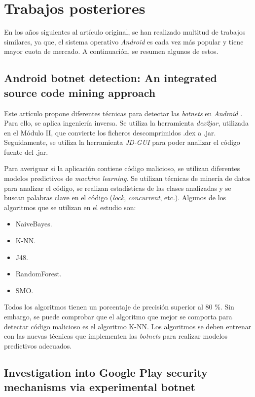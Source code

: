 \documentclass[a4paper,11pt]{report}
\begin{document}
\chapter{Trabajos posteriores} \label{tPosteriores}

En los años siguientes al artículo original, se han realizado multitud de trabajos similares, ya que, el sistema operativo \emph{Android} es cada vez más popular y tiene mayor cuota de mercado. A continuación, se resumen algunos de estos.

\section{Android botnet detection: An integrated source code mining approach}

Este artículo propone diferentes técnicas para detectar las \emph{botnets} en \emph{Android} \cite{posterior1}. Para ello, se aplica ingeniería inversa. Se utiliza la herramienta \emph{dex2jar}, utilizada en el Módulo II, que convierte los ficheros descomprimidos .dex a .jar. Seguidamente, se utiliza la herramienta \emph{JD-GUI} para poder analizar el código fuente del .jar.

Para averiguar si la aplicación contiene código malicioso, se utilizan diferentes modelos predictivos de \emph{machine learning}. Se utilizan técnicas de minería de datos para analizar el código, se realizan estadísticas de las clases analizadas y se buscan palabras clave en el código (\emph{lock}, \emph{concurrent}, etc.). Algunos de los algoritmos que se utilizan en el estudio son:

\begin{itemize}
\item NaiveBayes.
\item K-NN.
\item J48.
\item RandomForest.
\item SMO.
\end{itemize}

Todos los algoritmos tienen un porcentaje de precisión superior al 80 \%{}. Sin embargo, se puede comprobar que el algoritmo que mejor se comporta para detectar código malicioso es el algoritmo K-NN. Los algoritmos se deben entrenar con las nuevas técnicas que implementen las \emph{botnets} para realizar modelos predictivos adecuados.

\section{Investigation into Google Play security mechanisms via experimental botnet}
\end{document}
